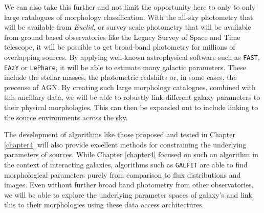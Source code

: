 We can also take this further and not limit the opportunity here to only to only large catalogues of morphology classification. With the all-sky photometry that will be available from \emph{Euclid}, or survey scale photometry that will be available from ground based observatories like the Legacy Survey of Space and Time telescope, it will be possible to get broad-band photometry for millions of overlapping sources. By applying well-known astrophysical software such as \texttt{FAST}, \texttt{EAzY} or \texttt{LePhare}, it will be able to estimate many galactic parameters. These include the stellar masses, the photometric redshifts or, in some cases, the precense of AGN. By creating such large morphology catalogues, combined with this ancillary data, we will be able to robustly link different galaxy parameters to their physical morphologies. This can then be expanded out to include linking to the source environments across the sky. 

The development of algorithms like those proposed and tested in Chapter \ref{chapter4} will also provide excellent methods for constraining the underlying parameters of sources. While Chapter \ref{chapter4} focused on such an algorithm in the context of interacting galaxies, algorithms such as \texttt{GALFIT} are able to find morphological parameters purely from comparison to flux distributions and images. Even without further broad band photometry from other observatories, we will be able to explore the underlying parameter spaces of galaxy's and link this to their morphologies using these data access architectures. 

